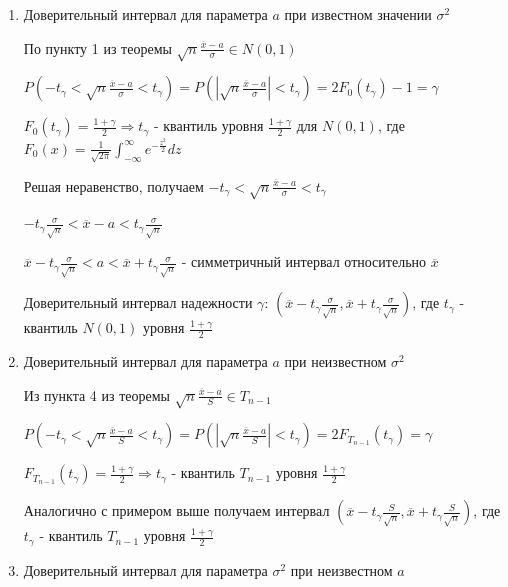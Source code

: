 \documentclass[12pt]{article}
\begin{document}
\begin{enumerate}[label*=\Roman*.]
    \item Доверительный интервал для параметра $a$ при известном значении $\sigma^2$

    По пункту 1 из теоремы $\sqrt{n} \frac{\overline{x} - a}{\sigma} \in N(0, 1)$ 

    $P\left(-t_\gamma < \sqrt{n} \frac{\overline{x} - a}{\sigma} < t_\gamma\right) = 
    P\left(\left|\sqrt{n} \frac{\overline{x} - a}{\sigma}\right| < t_\gamma\right) = 2F_0 (t_\gamma) - 1 = \gamma$

    $F_0(t_\gamma) = \frac{1 + \gamma}{2} \Longrightarrow t_\gamma$ - квантиль уровня 
    $\frac{1 + \gamma}{2}$ для $N(0, 1)$, где
    $F_0(x) = \frac{1}{\sqrt{2\pi}} \int_{-\infty}^{\infty} e^{-\frac{z^2}{2}} dz$

    Решая неравенство, получаем $-t_\gamma < \sqrt{n} \frac{\overline{x} - a}{\sigma} < t_\gamma$

    $-t_\gamma \frac{\sigma}{\sqrt{n}} < \overline{x} - a < t_\gamma \frac{\sigma}{\sqrt{n}}$

    $\overline{x} - t_\gamma \frac{\sigma}{\sqrt{n}} < a < \overline{x} + t_\gamma \frac{\sigma}{\sqrt{n}}$ - 
    симметричный интервал относительно $\overline{x}$

    Доверительный интервал надежности $\gamma$: $\left(\overline{x} - t_\gamma \frac{\sigma}{\sqrt{n}}, 
    \overline{x} + t_\gamma \frac{\sigma}{\sqrt{n}}\right)$, 
    где $t_\gamma$ - квантиль $N(0, 1)$ уровня $\frac{1 + \gamma}{2}$

    \item Доверительный интервал для параметра $a$ при неизвестном $\sigma^2$

    Из пункта 4 из теоремы $\sqrt{n} \frac{\overline{x} - a}{S} \in T_{n - 1}$

    $P\left(-t_\gamma < \sqrt{n} \frac{\overline{x} - a}{S} < t_\gamma\right) = P\left(\left|\sqrt{n} \frac{\overline{x} - a}{S}\right| < t_\gamma\right) = 2F_{T_{n - 1}}(t_\gamma) = \gamma$

    $F_{T_{n - 1}}(t_\gamma) = \frac{1 + \gamma}{2} \Longrightarrow t_\gamma$ - квантиль $T_{n - 1}$ уровня 
    $\frac{1 + \gamma}{2}$

    Аналогично с примером выше получаем интервал $\left(\overline{x} - t_\gamma \frac{S}{\sqrt{n}}, 
    \overline{x} + t_\gamma \frac{S}{\sqrt{n}}\right)$, 
    где $t_\gamma$ - квантиль $T_{n - 1}$ уровня $\frac{1 + \gamma}{2}$

    \item Доверительный интервал для параметра $\sigma^2$ при неизвестном $a$


\end{enumerate}
\end{document}
